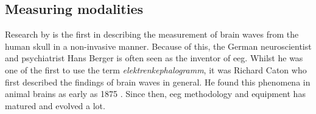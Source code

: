 
\subsection{Measuring modalities}
\label{subsec:biomedical_signals_measuring_modalities}






\lipsum[1-7]

Research by \citet{human_eeg_discovery} is the first in describing the measurement of brain waves from the human skull in a non-invasive manner.
Because of this, the German neuroscientist and psychiatrist Hans Berger is often seen as the inventor of \gls{eeg}.
Whilst he was one of the first to use the term \textit{elektrenkephalogramm}, it was Richard Caton who first described the findings of brain waves in general.
He found this phenomena in animal brains as early as 1875 \citep{first_eeg}.
Since then, \gls{eeg} methodology and equipment has matured and evolved a lot.


